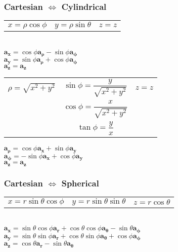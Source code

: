 \documentclass[12pt]{exam}
\begin{document}
\begin{multicols}{2}
\begin{flushleft}
	\subsubsection*{Cartesian $\Leftrightarrow$ Cylindrical}
			\vspace{0.1in}
		\begin{tabular}{c c c}
			$x=\rho\cos\phi$ & $y=\rho\sin\theta$ & $z=z$
		\end{tabular} \\
		\vspace{0.1in}
		$\mathbf{a_x} = \cos\phi\mathbf{a_\rho}-\sin\phi\mathbf{a_\phi}$ \\ 		\vspace{0.1in}
		$\mathbf{a_y} = \sin\phi\mathbf{a_\rho}+\cos\phi\mathbf{a_\phi}$ \\		\vspace{0.1in}
		$\mathbf{a_z} = \mathbf{a_z}$ \\
		\bigskip
		\begin{tabular}{c c c}
			$\rho=\sqrt{x^2+y^2}$ & $\sin\phi=\dfrac{y}{\sqrt{x^2+y^2}}$ & $z=z$ \\
			& $\cos\phi=\dfrac{x}{\sqrt{x^2+y^2}}$ & \\
			& $\tan\phi=\dfrac{y}{x}$ &
		\end{tabular} 		\vspace{0.1in}
		$\mathbf{a_\rho} = \cos\phi\mathbf{a_x}+\sin\phi\mathbf{a_y}$ \\ 		\vspace{0.1in}
		$\mathbf{a_\phi} = -\sin\phi\mathbf{a_x}+\cos\phi\mathbf{a_y}$ \\ 		\vspace{0.1in}
		$\mathbf{a_z} = \mathbf{a_z}$ \\ 		\vspace{0.1in}
	
	\subsubsection*{Cartesian $\Leftrightarrow$ Spherical} 		\vspace{0.1in}
		\begin{tabular}{c c c}
			$x=r\sin\theta\cos\phi$ & $y=r\sin\theta\sin\theta$ & $z=r\cos\theta$
		\end{tabular} \\ 		\vspace{0.1in}
		$\mathbf{a_x} = \sin\theta\cos\phi\mathbf{a_r}+\cos\theta\cos\phi\mathbf{a_\theta}-\sin\theta\mathbf{a_\phi}$ \\ 		\vspace{0.1in}
		$\mathbf{a_y} = \sin\theta\sin\phi\mathbf{a_r}+\cos\theta\sin\phi\mathbf{a_\theta}+\cos\phi\mathbf{a_\phi}$ \\ 		\vspace{0.1in}
		$\mathbf{a_z} = \cos\theta\mathbf{a_r}-\sin\theta\mathbf{a_\theta}$ \\ 		\vspace{0.1in}
		

\end{flushleft}
\end{multicols}
\end{document}
